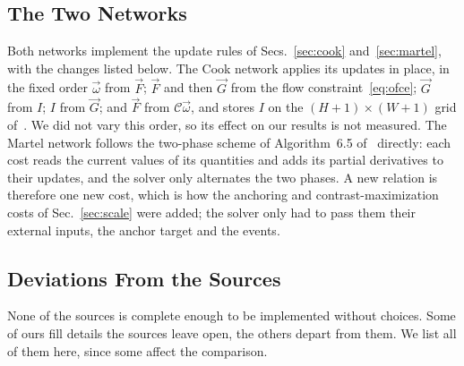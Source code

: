 \documentclass[journal]{IEEEtran}
\newcommand{\Imap}{I}
\newcommand{\Gmap}{\vec{G}}
\newcommand{\Fmap}{\vec{F}}
\newcommand{\Cmat}{\mathcal{C}}
\newcommand{\wvec}{\vec{\omega}}
\begin{document}
\subsection{The Two Networks}
\label{sec:networks}

Both networks implement the update rules of Secs.~\ref{sec:cook} and~\ref{sec:martel}, with the changes listed below. The Cook network applies its updates in place, in the fixed order $\wvec$ from $\Fmap$; $\Fmap$ and then $\Gmap$ from the flow constraint~\eqref{eq:ofce}; $\Gmap$ from $\Imap$; $\Imap$ from $\Gmap$; and $\Fmap$ from $\Cmat\wvec$, and stores $\Imap$ on the $(H\!+\!1)\times(W\!+\!1)$ grid of~\cite{cook2011}. We did not vary this order, so its effect on our results is not measured. The Martel network follows the two-phase scheme of Algorithm~6.5 of~\cite{martel2019thesis} directly: each cost reads the current values of its quantities and adds its partial derivatives to their updates, and the solver only alternates the two phases. A new relation is therefore one new cost, which is how the anchoring and contrast-maximization costs of Sec.~\ref{sec:scale} were added; the solver only had to pass them their external inputs, the anchor target and the events.


\subsection{Deviations From the Sources}
\label{sec:deviations}
None of the sources is complete enough to be implemented without choices. Some of ours fill details the sources leave open, the others depart from them. We list all of them here, since some affect the comparison.
\end{document}
